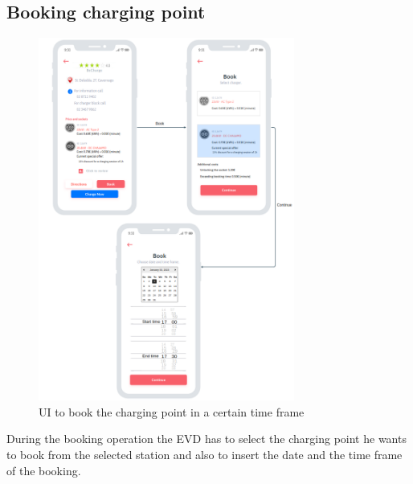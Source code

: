 \subsection{Booking charging point}
\begin{figure}[H]
    \centering
    \includegraphics[width=0.75\textwidth]{Images/cp3/bookingCP.png}
    \caption{UI to book the charging point in a certain time frame}
\end{figure}
During the booking operation the EVD has to select the charging point he wants to book from the selected station and also to insert the date and the time frame of the booking. 

